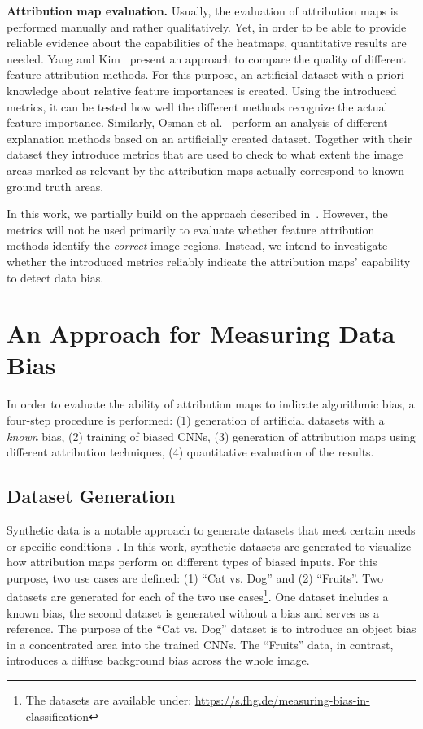 \documentclass[runningheads]{llncs}
\begin{document}
\textbf{Attribution map evaluation.} Usually, the evaluation of attribution maps is performed manually and rather qualitatively. Yet, in order to be able to provide reliable evidence about the capabilities of the heatmaps, quantitative results are needed. Yang and Kim~\cite{Yang.23.07.2019} present an approach to compare the quality of different feature attribution methods. For this purpose, an artificial dataset with a priori knowledge about relative feature importances is created. Using the introduced metrics, it can be tested how well the different methods recognize the actual feature importance. Similarly, Osman et al.~\cite{Osman.2020} perform an analysis of different explanation methods based on an artificially created dataset. Together with their dataset they introduce metrics that are used to check to what extent the image areas marked as relevant by the attribution maps actually correspond to known ground truth areas.

In this work, we partially build on the approach described in~\cite{Osman.2020}. However, the metrics will not be used primarily to evaluate whether feature attribution methods identify the \emph{correct} image regions. Instead, we intend to investigate whether the introduced metrics reliably indicate the attribution maps' capability to detect data bias.


\section{An Approach for Measuring Data Bias}
In order to evaluate the ability of attribution maps to indicate algorithmic bias, a four-step procedure is performed: (1) generation of artificial datasets with a \emph{known} bias, (2) training of biased CNNs, (3) generation of attribution maps using different attribution techniques, (4) quantitative evaluation of the results.

\subsection{Dataset Generation}
Synthetic data is a notable approach to generate datasets that meet certain needs or specific conditions~\cite{Sergey.2019}. 
In this work, synthetic datasets are generated to visualize how attribution maps perform on different types of biased inputs. For this purpose, two use cases are defined: (1) \enquote{Cat vs. Dog} and (2) \enquote{Fruits}. Two datasets are generated for each of the two use cases\footnote{The datasets are available under: \url{https://s.fhg.de/measuring-bias-in-classification}}. One dataset includes a known bias, the second dataset is generated without a bias and serves as a reference. The purpose of the \enquote{Cat vs. Dog} dataset is to introduce an object bias in a concentrated area into the trained CNNs. The \enquote{Fruits} data, in contrast, introduces a diffuse background bias across the whole image.
\end{document}
